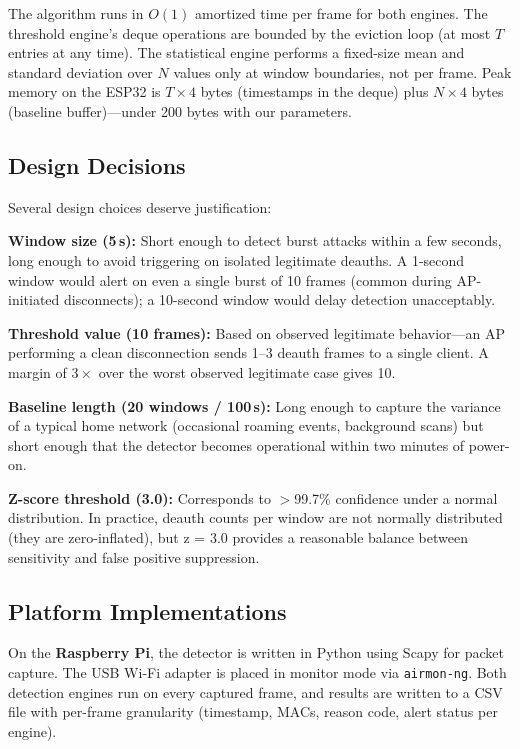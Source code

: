 \documentclass[conference]{IEEEtran}
\begin{document}
The algorithm runs in $O(1)$ amortized time per frame for both engines. The threshold engine's deque operations are bounded by the eviction loop (at most $T$ entries at any time). The statistical engine performs a fixed-size mean and standard deviation over $N$ values only at window boundaries, not per frame. Peak memory on the ESP32 is $T \times 4$ bytes (timestamps in the deque) plus $N \times 4$ bytes (baseline buffer)---under 200 bytes with our parameters.

\subsection{Design Decisions}

Several design choices deserve justification:

\textbf{Window size (5\,s):} Short enough to detect burst attacks within a few seconds, long enough to avoid triggering on isolated legitimate deauths. A 1-second window would alert on even a single burst of 10 frames (common during AP-initiated disconnects); a 10-second window would delay detection unacceptably.

\textbf{Threshold value (10 frames):} Based on observed legitimate behavior---an AP performing a clean disconnection sends 1--3 deauth frames to a single client. A margin of $3\times$ over the worst observed legitimate case gives 10.

\textbf{Baseline length (20 windows / 100\,s):} Long enough to capture the variance of a typical home network (occasional roaming events, background scans) but short enough that the detector becomes operational within two minutes of power-on.

\textbf{Z-score threshold (3.0):} Corresponds to $>$99.7\% confidence under a normal distribution. In practice, deauth counts per window are not normally distributed (they are zero-inflated), but z = 3.0 provides a reasonable balance between sensitivity and false positive suppression.

\subsection{Platform Implementations}

On the \textbf{Raspberry Pi}, the detector is written in Python using Scapy for packet capture. The USB Wi-Fi adapter is placed in monitor mode via \texttt{airmon-ng}. Both detection engines run on every captured frame, and results are written to a CSV file with per-frame granularity (timestamp, MACs, reason code, alert status per engine).
\end{document}
